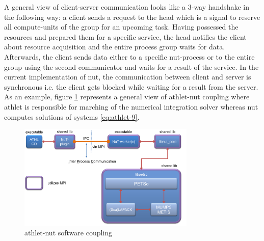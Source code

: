 A general view of client-server communication looks like a 3-way handshake in the following way: a client sends a request to the head which is a signal to reserve all compute-units of the group for an upcoming task. Having possessed the resources and prepared them for a specific service, the head notifies the client about resource acquisition and the entire process group waits for data. Afterwards, the client sends data either to a specific \gls{nut}-process or to the entire group using the second communicator and waits for a result of the service. In the current implementation of \gls{nut}, the communication between client and server is synchronous i.e. the client gets blocked while waiting for a result from the server. \\


As an example, figure \ref{fig:introduction-athlet-nut-coupling} represents a general view of \gls{athlet}-\gls{nut} coupling where \gls{athlet} is responsible for marching of the numerical integration solver whereas \gls{nut} computes solutions of systems \ref{eq:athlet-9}.\\


\figpointer{\ref{fig:introduction-athlet-nut-coupling}}
\begin{figure}
  \centering
  \includegraphics[width=0.75\textwidth]{figures/introduction-athlet-nut-coupling.png}
    \caption{\gls{athlet}-\gls{nut} software coupling}
\label{fig:introduction-athlet-nut-coupling}
\end{figure}


